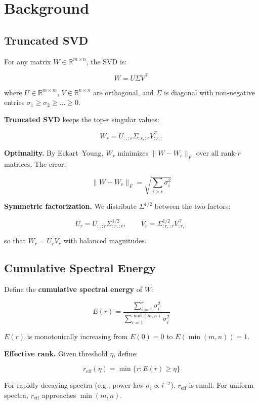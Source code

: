 
\section{Background}

\subsection{Truncated SVD}

For any matrix $W \in \mathbb{R}^{m \times n}$, the SVD is:

\[
W = U \Sigma V^\top
\tag{3.1}
\]

where $U \in \mathbb{R}^{m \times m}$, $V \in \mathbb{R}^{n \times n}$ are 
orthogonal, and $\Sigma$ is diagonal with non-negative entries 
$\sigma_1 \geq \sigma_2 \geq \dots \geq 0$.

\textbf{Truncated SVD} keeps the top-$r$ singular values:

\[
W_r = U_{:, :r} \Sigma_{:r, :r} V_{:r, :}^\top
\tag{3.2}
\]

\textbf{Optimality.} By Eckart--Young, $W_r$ minimizes $\|W - W_r\|_F$ over all 
rank-$r$ matrices. The error:

\[
\|W - W_r\|_F = \sqrt{\sum_{i > r} \sigma_i^2}
\tag{3.3}
\]

\textbf{Symmetric factorization.} We distribute $\Sigma^{1/2}$ between the two 
factors:

\[
U_r = U_{:, :r} \Sigma_{:r, :r}^{1/2}, \qquad
V_r = \Sigma_{:r, :r}^{1/2} V_{:r, :}^\top
\tag{3.4}
\]

so that $W_r = U_r V_r$ with balanced magnitudes.

\subsection{Cumulative Spectral Energy}

Define the \textbf{cumulative spectral energy} of $W$:

\[
E(r) = \frac{\sum_{i=1}^{r} \sigma_i^2}{\sum_{i=1}^{\min(m, n)} \sigma_i^2}
\tag{3.5}
\]

$E(r)$ is monotonically increasing from $E(0) = 0$ to $E(\min(m, n)) = 1$.

\textbf{Effective rank.} Given threshold $\eta$, define:

\[
r_\text{eff}(\eta) = \min\{r : E(r) \geq \eta\}
\tag{3.6}
\]

For rapidly-decaying spectra (e.g., power-law $\sigma_i \propto i^{-2}$), 
$r_\text{eff}$ is small. For uniform spectra, $r_\text{eff}$ approaches 
$\min(m, n)$.

